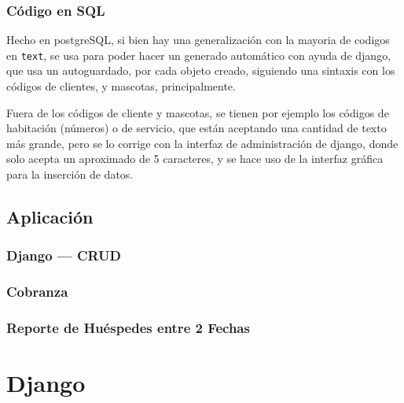 \documentclass[
  12pt,
  hidelinks,
  a4paper,
  headings=standardclasses,
  headings=big,
  spanish
]{scrartcl}
\begin{document}
\subsubsection{Código en SQL}

Hecho en postgreSQL, si bien hay una generalización con la mayoria de codigos en \texttt{text}, se usa para poder hacer un generado automático con ayuda de django, que usa un autoguardado, por cada objeto creado, siguiendo una sintaxis con los códigos de clientes, y mascotas, principalmente.

Fuera de los códigos de cliente y mascotas, se tienen por ejemplo los códigos de habitación (números) o de servicio, que están aceptando una cantidad de texto más grande, pero se lo corrige con la interfaz de administración de django, donde solo acepta un aproximado de 5 caracteres, y se hace uso de la interfaz gráfica para la inserción de datos.



\pagebreak
\subsection{Aplicación}
\subsubsection{Django --- CRUD}

\subsubsection{Cobranza}



\subsubsection{Reporte de Huéspedes entre 2 Fechas}



\pagebreak
\appendix
\section{Django}
\end{document}
